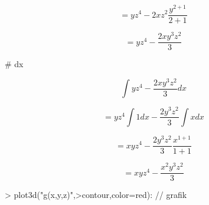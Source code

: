 \documentclass[a4paper,10pt]{article}
\begin{document}
\begin{eulernotebook}
\begin{eulercomment}
\begin{eulercomment}
\begin{eulercomment}
\begin{eulercomment}
\begin{eulercomment}
\begin{eulercomment}
\begin{eulercomment}
\begin{eulercomment}
\begin{eulercomment}
\begin{eulercomment}
\begin{eulercomment}
\begin{eulercomment}
\begin{eulercomment}
\end{eulercomment}
\begin{eulerformula}
\[
= yz^4 - 2xz^2 \frac {y^{2+1}} {2+1}
\]
\end{eulerformula}
\begin{eulercomment}
\end{eulercomment}
\begin{eulerformula}
\[
= yz^4 - \frac {2xy^3z^2} {3}
\]
\end{eulerformula}
\begin{eulercomment}
\end{eulercomment}
\begin{eulerttcomment}
 # dx
\end{eulerttcomment}
\begin{eulercomment}
\end{eulercomment}
\begin{eulerformula}
\[
\int yz^4 - \frac {2xy^3z^2} {3} dx
\]
\end{eulerformula}
\begin{eulercomment}
\end{eulercomment}
\begin{eulerformula}
\[
= yz^4 \int 1 dx - \frac {2y^3z^2} {3} \int x dx
\]
\end{eulerformula}
\begin{eulercomment}
\end{eulercomment}
\begin{eulerformula}
\[
= xyz^4 - \frac {2y^3z^2} {3} \frac {x^{1+1}} {1+1}
\]
\end{eulerformula}
\begin{eulercomment}
\end{eulercomment}
\begin{eulerformula}
\[
= xyz^4 - \frac {x^2y^3z^2} {3}
\]
\end{eulerformula}
\begin{eulerprompt}
> plot3d("g(x,y,z)",>contour,color=red): // grafik
\end{eulerprompt}
\begin{eulercomment}
\begin{eulercomment}
\begin{eulercomment}
\end{eulercomment}
\begin{eulercomment}
\end{eulercomment}

\end{eulercomment}
\end{eulercomment}
\end{eulercomment}
\end{eulercomment}
\end{eulercomment}
\end{eulercomment}
\end{eulercomment}
\end{eulercomment}
\end{eulercomment}
\end{eulercomment}
\end{eulercomment}
\end{eulercomment}
\end{eulercomment}
\end{eulercomment}
\end{eulernotebook}
\end{document}
